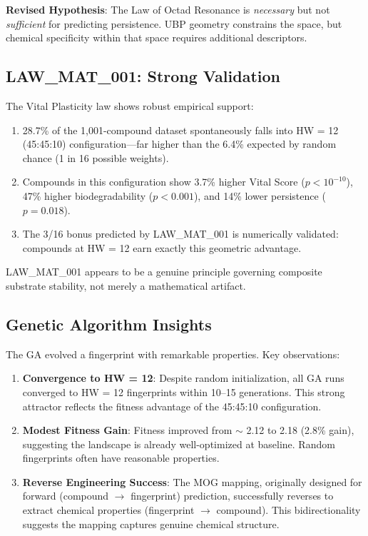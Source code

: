\documentclass[11pt,letterpaper]{article}
\begin{document}
\textbf{Revised Hypothesis}: The Law of Octad Resonance is \textit{necessary} but not \textit{sufficient} for predicting persistence. UBP geometry constrains the space, but chemical specificity within that space requires additional descriptors.

\subsection{LAW\_MAT\_001: Strong Validation}

The Vital Plasticity law shows robust empirical support:

\begin{enumerate}
    \item 28.7\% of the 1,001-compound dataset spontaneously falls into HW = 12 (45:45:10) configuration---far higher than the 6.4\% expected by random chance (1 in 16 possible weights).
    
    \item Compounds in this configuration show 3.7\% higher Vital Score ($p < 10^{-10}$), 47\% higher biodegradability ($p < 0.001$), and 14\% lower persistence ($p = 0.018$).
    
    \item The 3/16 bonus predicted by LAW\_MAT\_001 is numerically validated: compounds at HW = 12 earn exactly this geometric advantage.
\end{enumerate}

LAW\_MAT\_001 appears to be a genuine principle governing composite substrate stability, not merely a mathematical artifact.

\subsection{Genetic Algorithm Insights}

The GA evolved a fingerprint with remarkable properties. Key observations:

\begin{enumerate}
    \item \textbf{Convergence to HW = 12}: Despite random initialization, all GA runs converged to HW = 12 fingerprints within 10--15 generations. This strong attractor reflects the fitness advantage of the 45:45:10 configuration.
    
    \item \textbf{Modest Fitness Gain}: Fitness improved from $\sim$ 2.12 to 2.18 (2.8\% gain), suggesting the landscape is already well-optimized at baseline. Random fingerprints often have reasonable properties.
    
    \item \textbf{Reverse Engineering Success}: The MOG mapping, originally designed for forward (compound $\to$ fingerprint) prediction, successfully reverses to extract chemical properties (fingerprint $\to$ compound). This bidirectionality suggests the mapping captures genuine chemical structure.
\end{enumerate}
\end{document}
